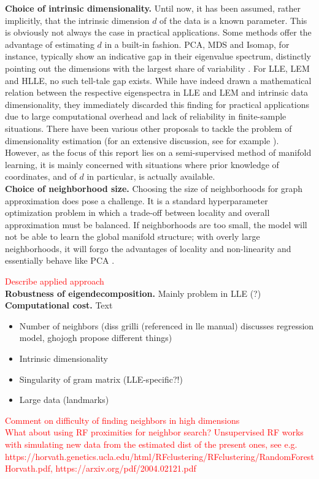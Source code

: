 \textbf{Choice of intrinsic dimensionality.} 
Until now, it has been assumed, rather implicitly, that the intrinsic dimension 
$d$ of the data is a known parameter.
This is obviously not always the case in practical applications.
Some methods offer the advantage of estimating $d$ in a built-in fashion. 
PCA, MDS and Isomap, for instance, typically show an indicative gap in their 
eigenvalue spectrum, distinctly pointing out the dimensions with the largest 
share of variability \citep{sauletal2006}.
For LLE, LEM and HLLE, no such tell-tale gap exists.
While \citet{shasaul2005} have indeed drawn a mathematical relation between the 
respective eigenspectra in LLE and LEM and intrinsic data dimensionality, they 
immediately discarded this finding for practical applications due to large 
computational overhead and lack of reliability in finite-sample situations.
There have been various other proposals to tackle the problem of dimensionality 
estimation (for an extensive discussion, see for example 
\citet{disswissel2017}).
However, as the focus of this report lies on a semi-supervised method of 
manifold learning, it is mainly concerned with situations where prior knowledge 
of coordinates, and of $d$ in particular, is actually available.
\\

\textbf{Choice of neighborhood size.} Choosing the size of neighborhoods for 
graph approximation does pose a challenge.
It is a standard hyperparameter optimization problem in which a trade-off 
between locality and overall approximation must be balanced.
If neighborhoods are too small, the model will not be able to learn the global 
manifold structure; with overly large neighborhoods, it will forgo the 
advantages of locality and non-linearity and essentially behave like PCA 
\citep{deridderduin2002}.

\textcolor{red}{Describe applied approach}
\\

\textbf{Robustness of eigendecomposition.} Mainly problem in LLE (?)
\\

\textbf{Computational cost.} Text
\\

\begin{itemize}
  \item Number of neighbors (diss grilli (referenced in lle manual) discusses 
  regression model, ghojogh propose different things)
  \item Intrinsic dimensionality
  \item Singularity of gram matrix (LLE-specific?!)
  \item Large data (landmarks)
\end{itemize}

\textcolor{red}{Comment on difficulty of finding neighbors in high dimensions}
\\
\textcolor{red}{What about using RF proximities for neighbor search? 
Unsupervised RF works with simulating new data from the estimated dist of the 
present ones, see e.g. https://horvath.genetics.ucla.edu/html/RFclustering/RFclustering/RandomForestHorvath.pdf, https://arxiv.org/pdf/2004.02121.pdf}
